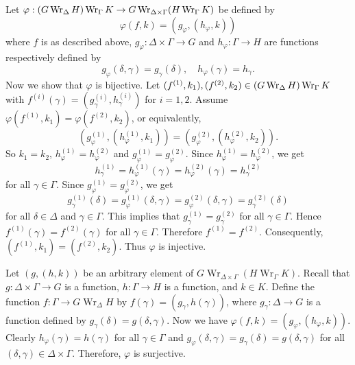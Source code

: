 \begin{sketch}
	Let $\varphi:(G\operatorname{Wr}_\Delta H) \operatorname{Wr}_\Gamma K \to G\operatorname{Wr}_{\Delta\times \Gamma} (H \operatorname{Wr}_\Gamma K)$ be defined by
	\begin{equation*}
		\varphi(f,k) = (g_\varphi,(h_\varphi,k))
	\end{equation*}
	where $f$ is as described above, $g_\varphi:\Delta\times\Gamma\to G$ and $h_\varphi:\Gamma \to H$ are functions respectively defined by
\begin{equation*}
	g_\varphi(\delta,\gamma) = g_\gamma(\delta),\quad 	h_\varphi(\gamma)= h_\gamma.
\end{equation*}
Now we show that $\varphi$ is bijective. Let $(f^{(1)},k_1),(f^{(2)},k_2)\in (G\operatorname{Wr}_\Delta H) \operatorname{Wr}_\Gamma K$ with $f^{(i)}(\gamma) = (g^{(i)}_\gamma, h^{(i)}_\gamma)$  for $i=1,2$.
Assume $\varphi(f^{(1)}, k_1) = \varphi(f^{(2)}, k_2)$, or equivalently,
\[
(g_\varphi^{(1)}, (h_\varphi^{(1)}, k_1)) = (g_\varphi^{(2)}, (h_\varphi^{(2)}, k_2)).
\]
So $k_1 = k_2$,   $h_\varphi^{(1)} = h_\varphi^{(2)}$ and  $g_\varphi^{(1)} = g_\varphi^{(2)}$. Since $h_\varphi^{(1)} = h_\varphi^{(2)}$, we get
\begin{equation*}
	h_{\gamma}^{(1)} = h_\varphi^{(1)}(\gamma) = h_\varphi^{(2)}(\gamma) = 	h_{\gamma}^{(2)}
\end{equation*}
for all $\gamma\in\Gamma$. Since $g_\varphi^{(1)} = g_\varphi^{(2)}$, we get 
\begin{equation*}
	g_\gamma^{(1)}(\delta) = g_{\varphi}^{(1)}(\delta,\gamma) = g_{\varphi}^{(2)}(\delta,\gamma) = g_\gamma^{(2)}(\delta)
\end{equation*} for all $\delta \in \Delta$ and $\gamma \in \Gamma$. This implies that  $g_\gamma^{(1)}=g_\gamma^{(2)}$ for all $\gamma \in \Gamma$. Hence  $f^{(1)}(\gamma) = f^{(2)}(\gamma)$ for all $\gamma \in \Gamma$. Therefore $f^{(1)} = f^{(2)}$. Consequently, $(f^{(1)}, k_1) = (f^{(2)}, k_2)$. Thus $\varphi$ is injective.

Let $(g, (h, k))$ be an arbitrary element of $G \operatorname{Wr}_{\Delta \times \Gamma} (H \operatorname{Wr}_\Gamma K)$.
Recall that $g: \Delta \times \Gamma \to G$ is a function, $h: \Gamma \to H$ is a function, and $k \in K$.  Define the function $f: \Gamma \to G \operatorname{Wr}_\Delta H$ by $f(\gamma) = (g_\gamma, h(\gamma))$, where  $g_\gamma:\Delta\to G$ is a function defined by $g_\gamma(\delta) = g(\delta,\gamma)$. Now we have 
$
\varphi(f, k) = (g_\varphi, (h_\varphi, k))$.
Clearly $h_\varphi(\gamma) = h(\gamma)$ for all $\gamma \in \Gamma$ and   $g_\varphi(\delta, \gamma) = g_\gamma(\delta) = g(\delta, \gamma)$ for all $(\delta, \gamma) \in \Delta \times \Gamma$.   Therefore, $\varphi$ is surjective.


\end{sketch}
